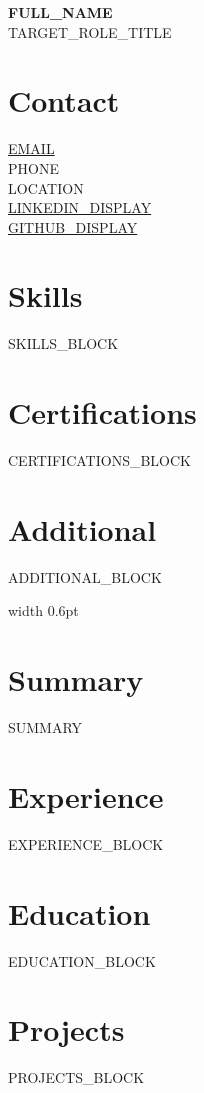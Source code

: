 \documentclass[a4paper,10pt]{article}
\begin{document}
\noindent
\begin{minipage}[t]{0.32\textwidth}
  {\Large\bfseries {{FULL_NAME}} }\\[2pt]
  {\small {{TARGET_ROLE_TITLE}} }

  \vspace{14pt}
  \section*{Contact}
  \small
  \href{mailto:{{EMAIL}}}{ {{EMAIL}} }\\
  {{PHONE}}\\
  {{LOCATION}}\\
  \href{ {{LINKEDIN_URL}} }{ {{LINKEDIN_DISPLAY}} }\\
  \href{ {{GITHUB_URL}} }{ {{GITHUB_DISPLAY}} }

  \vspace{10pt}
  \section*{Skills}
  \small
  {{SKILLS_BLOCK}}

  \vspace{10pt}
  \section*{Certifications}
  \small
  {{CERTIFICATIONS_BLOCK}}

  \vspace{10pt}
  \section*{Additional}
  \small
  {{ADDITIONAL_BLOCK}}
\end{minipage}
\hfill
\vrule width 0.6pt
\hfill
\begin{minipage}[t]{0.62\textwidth}
  \section*{Summary}
  {{SUMMARY}}

  \section*{Experience}
  {{EXPERIENCE_BLOCK}}

  \section*{Education}
  {{EDUCATION_BLOCK}}

  \section*{Projects}
  {{PROJECTS_BLOCK}}
\end{minipage}
\end{document}
